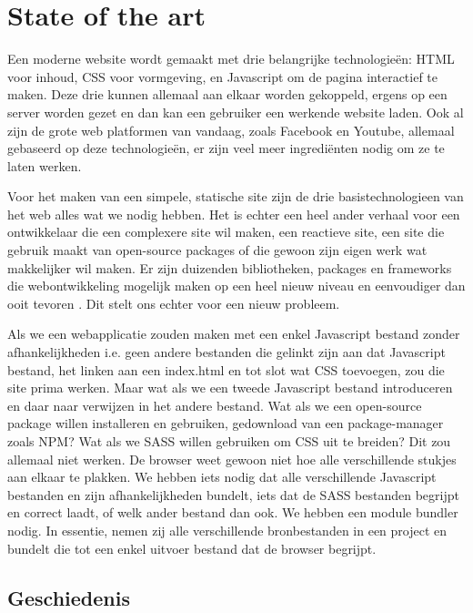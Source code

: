\chapter{State of the art}
\label{ch:stand-van-zaken}

Een moderne website wordt gemaakt met drie belangrijke technologieën: \gls{HTML} voor inhoud, \gls{CSS} voor vormgeving, en \gls{Javascript} om de pagina interactief te maken. Deze drie kunnen allemaal aan elkaar worden gekoppeld, ergens op een server worden gezet en dan kan een gebruiker een werkende website laden. Ook al zijn de grote web platformen van vandaag, zoals Facebook en Youtube, allemaal gebaseerd op deze technologieën, er zijn veel meer ingrediënten nodig om ze te laten werken.

Voor het maken van een simpele, statische site zijn de drie basistechnologieen van het web alles wat we nodig hebben. Het is echter een heel ander verhaal voor een ontwikkelaar die een complexere site wil maken, een reactieve site, een site die gebruik maakt van \gls{open-source} \gls{packages} of die gewoon zijn eigen werk wat makkelijker wil maken. Er zijn duizenden bibliotheken, packages en frameworks die webontwikkeling mogelijk maken op een heel nieuw niveau en eenvoudiger dan ooit tevoren \autocite{NPM}. Dit stelt ons echter voor een nieuw probleem. 

Als we een webapplicatie zouden maken met een enkel \gls{Javascript} bestand zonder afhankelijkheden i.e. geen andere bestanden die gelinkt zijn aan dat \gls{Javascript} bestand, het linken aan een index.html en tot slot wat \gls{CSS} toevoegen, zou die site prima werken. Maar wat als we een tweede \gls{Javascript} bestand introduceren en daar naar verwijzen in het andere bestand. Wat als we een \gls{open-source} \gls{package} willen installeren en gebruiken, gedownload van een \gls{package-manager} zoals NPM? Wat als we \gls{SASS} willen gebruiken om \gls{CSS} uit te breiden? Dit zou allemaal niet werken. De browser weet gewoon niet hoe alle verschillende stukjes aan elkaar te plakken.
We hebben iets nodig dat alle verschillende \gls{Javascript} bestanden en zijn afhankelijkheden bundelt, iets dat de \gls{SASS} bestanden begrijpt en correct laadt, of welk ander bestand dan ook. We hebben een module bundler nodig. In essentie, nemen zij alle verschillende bronbestanden in een project en bundelt die tot een enkel uitvoer bestand dat de browser begrijpt.

\section{Geschiedenis}

